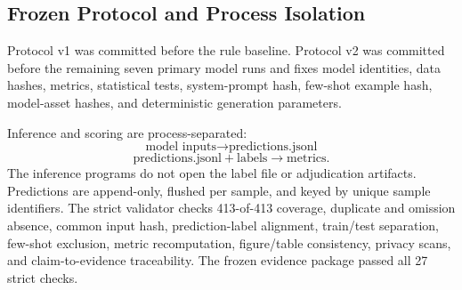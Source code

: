 \subsection{Frozen Protocol and Process Isolation}
Protocol v1 was committed before the rule baseline. Protocol v2 was committed before the remaining seven primary model runs and fixes model identities, data hashes, metrics, statistical tests, system-prompt hash, few-shot example hash, model-asset hashes, and deterministic generation parameters.

Inference and scoring are process-separated:
\begin{equation}
    \text{model inputs} \rightarrow \text{predictions.jsonl}
\end{equation}
\begin{equation}
    \text{predictions.jsonl} + \text{labels} \rightarrow \text{metrics}.
\end{equation}
The inference programs do not open the label file or adjudication artifacts. Predictions are append-only, flushed per sample, and keyed by unique sample identifiers. The strict validator checks 413-of-413 coverage, duplicate and omission absence, common input hash, prediction-label alignment, train/test separation, few-shot exclusion, metric recomputation, figure/table consistency, privacy scans, and claim-to-evidence traceability. The frozen evidence package passed all 27 strict checks.
